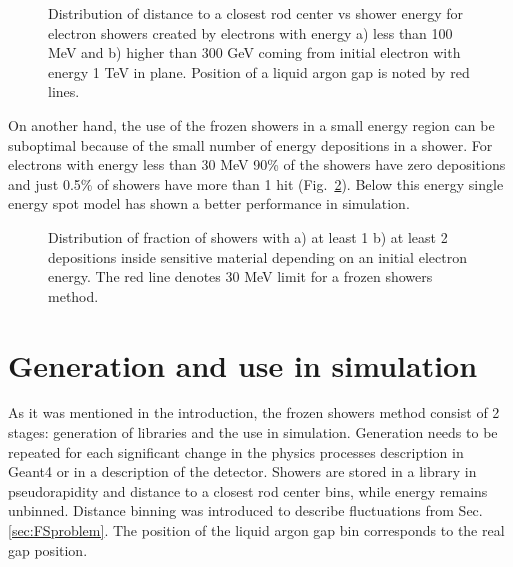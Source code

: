 \begin{figure}[!tbp]
\begin{minipage}[h]{0.49\linewidth}
\end{minipage}
\hfill
\begin{minipage}[h]{0.49\linewidth}
\end{minipage}
\caption{Distribution of distance to a closest rod center vs shower energy for electron showers created by electrons with energy a) less than 100 MeV  and b) higher than 300 GeV coming from initial electron with energy 1 TeV in  plane. Position of a liquid argon gap is noted by red lines. }
\label{fig:FSProduction2}
\end{figure}

On another hand, the use of the frozen showers in a small energy region can be suboptimal because of the small number of energy depositions in a shower. For electrons with energy less than 30 MeV 90\% of the showers have zero depositions and just 0.5\% of showers have more than 1 hit (Fig.~\ref{fig:fracHits}). Below this energy single energy spot model has shown a better performance in simulation.

\begin{figure}[!tbp]
\begin{minipage}[h]{0.49\linewidth}
\end{minipage}
\hfill
\begin{minipage}[h]{0.49\linewidth}
\end{minipage}
\caption{Distribution of fraction of showers with a) at least 1 b) at least 2 depositions inside sensitive material depending on an initial electron energy. The red line denotes 30 MeV limit for a frozen showers method.}
\label{fig:fracHits}
\end{figure}


\section{Generation and use in simulation}

As it was mentioned in the introduction, the frozen showers method consist of 2 stages: generation of libraries and the use in simulation. Generation needs to be repeated for each significant change in the physics processes description in Geant4 or in a description of the detector. Showers are stored in a library in pseudorapidity and distance to a closest rod center bins, while energy remains unbinned. Distance binning was introduced to describe fluctuations from Sec. \ref{sec:FSproblem}. The position of the liquid argon gap bin corresponds to the real gap position. 

